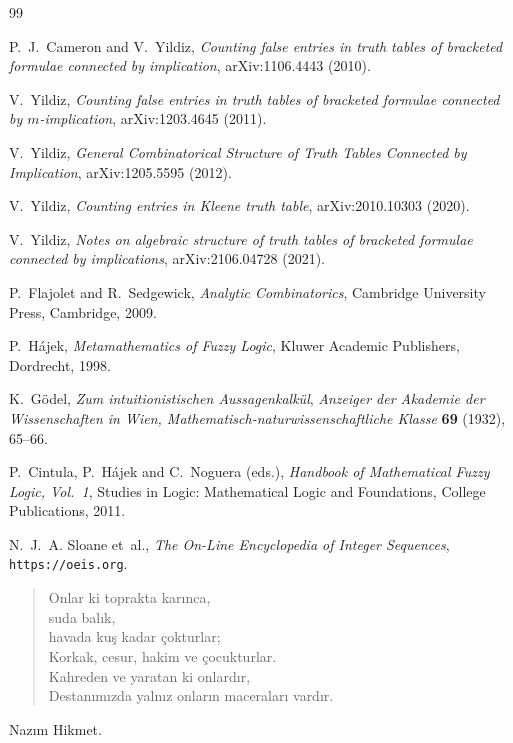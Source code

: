 \documentclass[11pt]{article}
\begin{document}
\begin{thebibliography}{99}

P.~J.~Cameron and V.~Yildiz,
\newblock \emph{Counting false entries in truth tables of bracketed formulae connected by implication},
\newblock arXiv:1106.4443 (2010).

V.~Yildiz,
\newblock \emph{Counting false entries in truth tables of bracketed formulae connected by $m$-implication},
\newblock arXiv:1203.4645 (2011).

V.~Yildiz,
\newblock \emph{General Combinatorical Structure of Truth Tables Connected by Implication},
\newblock arXiv:1205.5595 (2012).

V.~Yildiz,
\newblock \emph{Counting entries in Kleene truth table},
\newblock arXiv:2010.10303 (2020).

V.~Yildiz,
\newblock \emph{Notes on algebraic structure of truth tables of bracketed formulae connected by implications},
\newblock arXiv:2106.04728 (2021).

P.~Flajolet and R.~Sedgewick,
\newblock \emph{Analytic Combinatorics},
\newblock Cambridge University Press, Cambridge, 2009.

P.~H{\'a}jek,
\newblock \emph{Metamathematics of Fuzzy Logic},
\newblock Kluwer Academic Publishers, Dordrecht, 1998.



K.~G{\"o}del,
\newblock \emph{Zum intuitionistischen Aussagenkalk{\"u}l},
\newblock \emph{Anzeiger der Akademie der Wissenschaften in Wien, Mathematisch-naturwissenschaftliche Klasse}
\textbf{69} (1932), 65--66.


P.~Cintula, P.~H{\'a}jek and C.~Noguera (eds.),
\newblock \emph{Handbook of Mathematical Fuzzy Logic, Vol.~1},
\newblock Studies in Logic: Mathematical Logic and Foundations, College Publications, 2011.

N.~J.~A. Sloane et~al.,
\newblock \emph{The On-Line Encyclopedia of Integer Sequences},
\newblock \texttt{https://oeis.org}.

\end{thebibliography}



\vspace{8em}

\begin{verse}
Onlar ki toprakta karınca,\\
suda balık,\\
havada kuş kadar çokturlar;\\
Korkak, cesur, hakim ve çocukturlar.\\
Kahreden ve yaratan ki onlardır,\\
Destanımızda yalnız onların maceraları vardır.
\end{verse}

\begin{flushleft}
Nazım Hikmet.
\end{flushleft}
\end{document}
